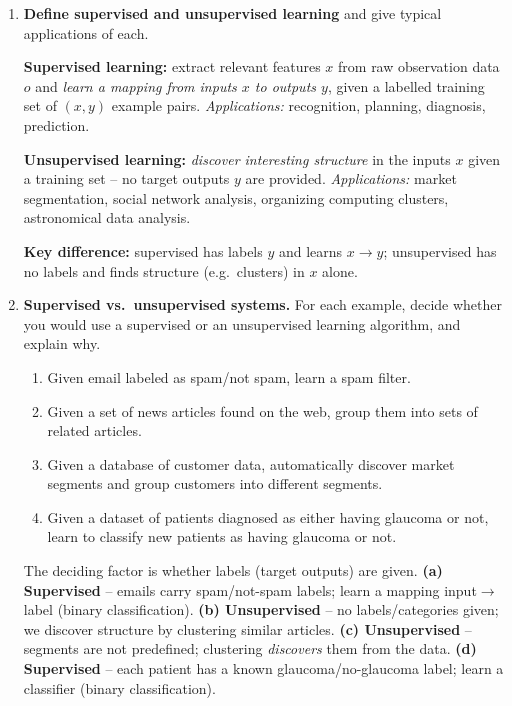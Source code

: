 \documentclass[10pt,a4paper]{article}
\newcommand{\q}[1]{\item #1}
\begin{document}
\begin{enumerate}[leftmargin=*,label=\textbf{Q\arabic*.}]

\q \textbf{Define supervised and unsupervised learning} and give typical applications of each.
\begin{answerbox}
\textbf{Supervised learning:} extract relevant features $x$ from raw observation data $o$ and \emph{learn a mapping from inputs $x$ to outputs $y$}, given a labelled training set of $(x,y)$ example pairs.
\emph{Applications:} recognition, planning, diagnosis, prediction.

\textbf{Unsupervised learning:} \emph{discover interesting structure} in the inputs $x$ given a training set -- no target outputs $y$ are provided.
\emph{Applications:} market segmentation, social network analysis, organizing computing clusters, astronomical data analysis.

\textbf{Key difference:} supervised has labels $y$ and learns $x\to y$; unsupervised has no labels and finds structure (e.g.\ clusters) in $x$ alone.
\end{answerbox}

\q \textbf{Supervised vs.\ unsupervised systems.} For each example, decide whether you would use a supervised or an unsupervised learning algorithm, and explain why.
\begin{enumerate}[label=\textbf{(\alph*)}]
  \item Given email labeled as spam/not spam, learn a spam filter.
  \item Given a set of news articles found on the web, group them into sets of related articles.
  \item Given a database of customer data, automatically discover market segments and group customers into different segments.
  \item Given a dataset of patients diagnosed as either having glaucoma or not, learn to classify new patients as having glaucoma or not.
\end{enumerate}
\begin{answerbox}
The deciding factor is whether labels (target outputs) are given.
\textbf{(a) Supervised} -- emails carry spam/not-spam labels; learn a mapping input$\to$label (binary classification).
\textbf{(b) Unsupervised} -- no labels/categories given; we discover structure by clustering similar articles.
\textbf{(c) Unsupervised} -- segments are not predefined; clustering \emph{discovers} them from the data.
\textbf{(d) Supervised} -- each patient has a known glaucoma/no-glaucoma label; learn a classifier (binary classification).
\end{answerbox}


\end{enumerate}
\end{document}
